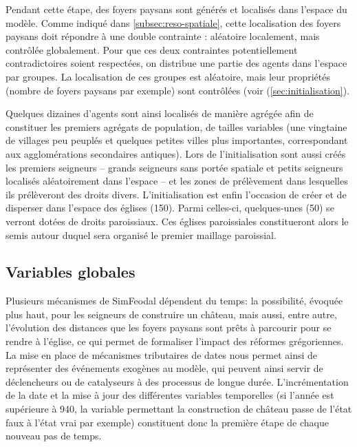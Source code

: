 \begin{tcolorbox}[breakable,left=0pt,right=0pt,top=0pt,bottom=0pt,
	colback=gray!15,colframe=gray!15,width=\dimexpr\textwidth\relax, 
	enlarge left by=0mm, boxsep=5pt,arc=0pt,outer arc=0pt]
Pendant cette étape, des foyers paysans sont générés et localisés dans l'espace du modèle.
Comme indiqué dans \cref{subsec:reso-spatiale}, cette localisation des foyers paysans doit répondre à une double contrainte : aléatoire localement, mais contrôlée globalement.
Pour que ces deux contraintes potentiellement contradictoires soient respectées, on distribue une partie des agents dans l'espace par groupes.
La localisation de ces groupes est aléatoire, mais leur propriétés (nombre de foyers paysans par exemple) sont contrôlées (voir (\cref{sec:initialisation}).

Quelques dizaines d'agents sont ainsi localisés de manière agrégée afin de constituer les premiers agrégats de population, de tailles variables (une vingtaine de villages peu peuplés et quelques petites villes plus importantes, correspondant aux agglomérations secondaires antiques).
Lors de l'initialisation sont aussi créés les premiers seigneurs -- grands seigneurs sans portée spatiale et petits seigneurs localisés aléatoirement dans l'espace -- et les zones de prélèvement dans lesquelles ils prélèveront des droits divers.
L'initialisation est enfin l'occasion de créer et de disperser dans l'espace des églises (150).
Parmi celles-ci, quelques-unes (50) se verront dotées de droits paroissiaux.
Ces églises paroissiales constitueront alors le semis autour duquel sera organisé le premier maillage paroissial.
\end{tcolorbox}

\subsection{Variables globales \label{meca-variables}}


\begin{tcolorbox}[breakable,left=0pt,right=0pt,top=0pt,bottom=0pt,
	colback=gray!15,colframe=gray!15,width=\dimexpr\textwidth\relax, 
	enlarge left by=0mm, boxsep=5pt,arc=0pt,outer arc=0pt]
Plusieurs mécanismes de SimFeodal dépendent du temps:
la possibilité, évoquée plus haut, pour les seigneurs de construire un château, mais aussi, entre autre, l'évolution des distances que les foyers paysans sont prêts à parcourir pour se rendre à l'église, ce qui permet de formaliser l'impact des réformes grégoriennes.
La mise en place de mécanismes tributaires de dates nous permet ainsi de représenter des événements exogènes\footnotemark{} au modèle, qui peuvent ainsi servir de déclencheurs ou de catalyseurs à des processus de longue durée.
L'incrémentation de la date et la mise à jour des différentes variables temporelles (si l'année est supérieure à 940, la variable permettant la construction de château passe de l'état faux à l'état vrai par exemple) constituent donc la première étape de chaque nouveau pas de temps.
\end{tcolorbox}

